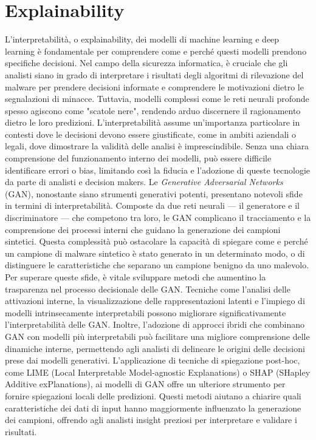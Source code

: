 \section{Explainability}
L'interpretabilità, o \gls{explainability}, dei modelli di machine learning e deep learning è fondamentale per comprendere come e perché questi modelli prendono specifiche decisioni. Nel campo della sicurezza informatica, è cruciale che gli analisti siano in grado di interpretare i risultati degli algoritmi di rilevazione del malware per prendere decisioni informate e comprendere le motivazioni dietro le segnalazioni di minacce. Tuttavia, modelli complessi come le reti neurali profonde spesso agiscono come "scatole nere", rendendo arduo discernere il ragionamento dietro le loro predizioni.
L'interpretabilità assume un'importanza particolare in contesti dove le decisioni devono essere giustificate, come in ambiti aziendali o legali, dove dimostrare la validità delle analisi è imprescindibile. Senza una chiara comprensione del funzionamento interno dei modelli, può essere difficile identificare errori o bias, limitando così la fiducia e l'adozione di queste tecnologie da parte di analisti e decision makers.
Le \emph{Generative Adversarial Networks} (GAN), nonostante siano strumenti generativi potenti, presentano notevoli sfide in termini di interpretabilità. Composte da due reti neurali — il generatore e il discriminatore — che competono tra loro, le GAN complicano il tracciamento e la comprensione dei processi interni che guidano la generazione dei campioni sintetici. Questa complessità può ostacolare la capacità di spiegare come e perché un campione di malware sintetico è stato generato in un determinato modo, o di distinguere le caratteristiche che separano un campione benigno da uno malevolo.
Per superare queste sfide, è vitale sviluppare metodi che aumentino la trasparenza nel processo decisionale delle GAN. Tecniche come l'analisi delle attivazioni interne, la visualizzazione delle rappresentazioni latenti e l'impiego di modelli intrinsecamente interpretabili possono migliorare significativamente l'interpretabilità delle GAN. Inoltre, l'adozione di approcci ibridi che combinano GAN con modelli più interpretabili può facilitare una migliore comprensione delle dinamiche interne, permettendo agli analisti di delineare le origini delle decisioni prese dai modelli generativi.
L'applicazione di tecniche di spiegazione post-hoc, come LIME (Local Interpretable Model-agnostic Explanations) o SHAP (SHapley Additive exPlanations), ai modelli di GAN offre un ulteriore strumento per fornire spiegazioni locali delle predizioni. Questi metodi aiutano a chiarire quali caratteristiche dei dati di input hanno maggiormente influenzato la generazione dei campioni, offrendo agli analisti insight preziosi per interpretare e validare i risultati.
